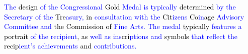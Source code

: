\begin{tcolorbox}
    \textcolor{blue}{The} \textcolor{black}{design} \textcolor{blue}{of} \textcolor{blue}{the} \textcolor{blue}{Cong}\textcolor{blue}{r}\textcolor{blue}{essional} \textcolor{black}{Gold} \textcolor{blue}{Medal} \textcolor{blue}{is} \textcolor{blue}{typically} \textcolor{black}{determined} \textcolor{blue}{by} \textcolor{blue}{the} \textcolor{blue}{Secretary} \textcolor{blue}{of} \textcolor{blue}{the} \textcolor{black}{Tre}\textcolor{blue}{as}\textcolor{blue}{ury}\textcolor{blue}{,} \textcolor{black}{in} \textcolor{blue}{consult}\textcolor{blue}{ation} \textcolor{blue}{with} \textcolor{blue}{the} \textcolor{black}{Cit}\textcolor{blue}{iz}\textcolor{blue}{ens} \textcolor{black}{Co}\textcolor{blue}{in}\textcolor{black}{age} \textcolor{blue}{Ad}\textcolor{blue}{vis}\textcolor{blue}{ory} \textcolor{blue}{Committee} \textcolor{blue}{and} \textcolor{black}{the} \textcolor{black}{Commission} \textcolor{black}{of} \textcolor{blue}{Fine} \textcolor{blue}{Arts}\textcolor{blue}{.} \textcolor{blue}{The} \textcolor{blue}{medal} \textcolor{black}{typically} \textcolor{blue}{features} \textcolor{blue}{a} \textcolor{black}{portrait} \textcolor{blue}{of} \textcolor{blue}{the} \textcolor{blue}{recip}\textcolor{blue}{ient}\textcolor{black}{,} \textcolor{black}{as} \textcolor{blue}{well} \textcolor{blue}{as} \textcolor{blue}{ins}\textcolor{black}{cri}\textcolor{blue}{ptions} \textcolor{blue}{and} \textcolor{black}{symbols} \textcolor{blue}{that} \textcolor{blue}{reflect} \textcolor{blue}{the} \textcolor{black}{recip}\textcolor{blue}{ient}\textcolor{blue}{'}\textcolor{blue}{s} \textcolor{blue}{achiev}\textcolor{blue}{ements} \textcolor{black}{and} \textcolor{blue}{contributions}\textcolor{blue}{.}
    

\end{tcolorbox}
